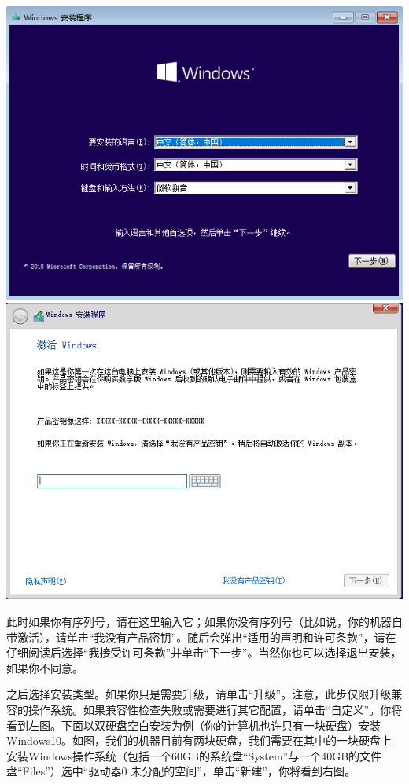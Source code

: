 \begin{center}
	\includegraphics[scale=0.22]{pic/win10setup2}	\includegraphics[scale=0.22]{pic/win10setup3}
\end{center} \par
此时如果你有序列号，请在这里输入它；如果你没有序列号（比如说，你的机器自带激活），请单击“我没有产品密钥”。随后会弹出“适用的声明和许可条款”，请在{\color{red}仔细阅读}后选择“我接受许可条款”并单击“下一步”。当然你也可以选择退出安装，如果你不同意。\par
之后选择安装类型。如果你只是需要升级，请单击“升级”。注意，此步仅限升级兼容的操作系统。如果兼容性检查失败或需要进行其它配置，请单击“自定义”。你将看到左图。下面以双硬盘空白安装为例（你的计算机也许只有一块硬盘）安装Windows10。如图，我们的机器目前有两块硬盘，我们需要在其中的一块硬盘上安装Windows操作系统（包括一个60GB的系统盘“System”与一个40GB的文件盘“Files”）选中“驱动器0 未分配的空间”，单击“新建”，你将看到右图。
